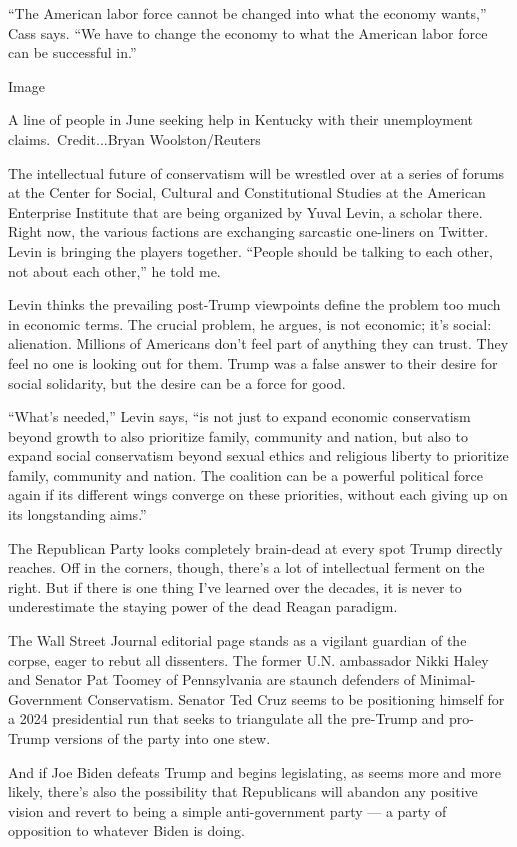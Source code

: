 ``The American labor force cannot be changed into what the economy
wants,'' Cass says. ``We have to change the economy to what the American
labor force can be successful in.''

Image

A line of people in June seeking help in Kentucky with their
unemployment claims.~Credit...Bryan Woolston/Reuters

The intellectual future of conservatism will be wrestled over at a
series of forums at the Center for Social, Cultural and Constitutional
Studies at the American Enterprise Institute that are being organized by
Yuval Levin, a scholar there. Right now, the various factions are
exchanging sarcastic one-liners on Twitter. Levin is bringing the
players together. ``People should be talking to each other, not about
each other,'' he told me.

Levin thinks the prevailing post-Trump viewpoints define the problem too
much in economic terms. The crucial problem, he argues, is not economic;
it's social: alienation. Millions of Americans don't feel part of
anything they can trust. They feel no one is looking out for them. Trump
was a false answer to their desire for social solidarity, but the desire
can be a force for good.

``What's needed,'' Levin says, ``is not just to expand economic
conservatism beyond growth to also prioritize family, community and
nation, but also to expand social conservatism beyond sexual ethics and
religious liberty to prioritize family, community and nation. The
coalition can be a powerful political force again if its different wings
converge on these priorities, without each giving up on its longstanding
aims.''

The Republican Party looks completely brain-dead at every spot Trump
directly reaches. Off in the corners, though, there's a lot of
intellectual ferment on the right. But if there is one thing I've
learned over the decades, it is never to underestimate the staying power
of the dead Reagan paradigm.

The Wall Street Journal editorial page stands as a vigilant guardian of
the corpse, eager to rebut all dissenters. The former U.N. ambassador
Nikki Haley and Senator Pat Toomey of Pennsylvania are staunch defenders
of Minimal-Government Conservatism. Senator Ted Cruz seems to be
positioning himself for a 2024 presidential run that seeks to
triangulate all the pre-Trump and pro-Trump versions of the party into
one stew.

And if Joe Biden defeats Trump and begins legislating, as seems more and
more likely, there's also the possibility that Republicans will abandon
any positive vision and revert to being a simple anti-government party
--- a party of opposition to whatever Biden is doing.

